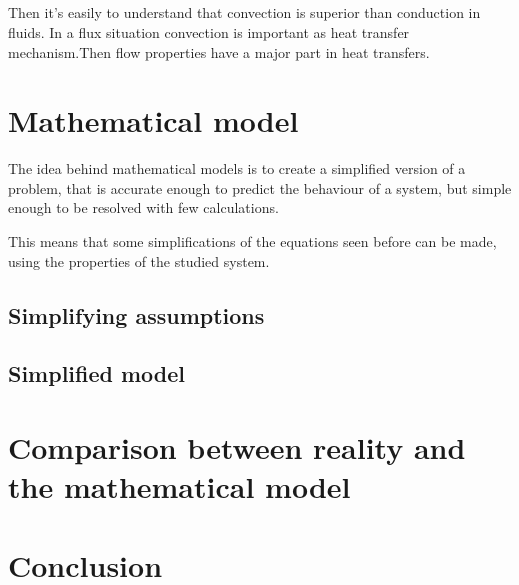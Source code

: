 \documentclass{report}
\begin{document}
	\paragraph{}Then it's easily to understand that convection is superior than conduction in fluids. In a flux situation convection is important as heat transfer mechanism.Then flow properties have a major part in heat transfers.
	
	\chapter{Mathematical model}\label{mm}
	
	The idea behind mathematical models is to create a simplified version of a problem, that is accurate enough to predict the behaviour of a system, but simple enough to be resolved with few calculations.
	
	This means that some simplifications of the equations seen before can be made, using the properties of the studied system.
	
	\section{Simplifying assumptions}\label{sa}
	
	\section{Simplified model}\label{sm}
	
	\chapter[Reality and mathematical model]{Comparison between reality and the mathematical model}\label{rvmm}
	
	\chapter{Conclusion}\label{ccl}
	
	
	{}
	
	
\end{document}
